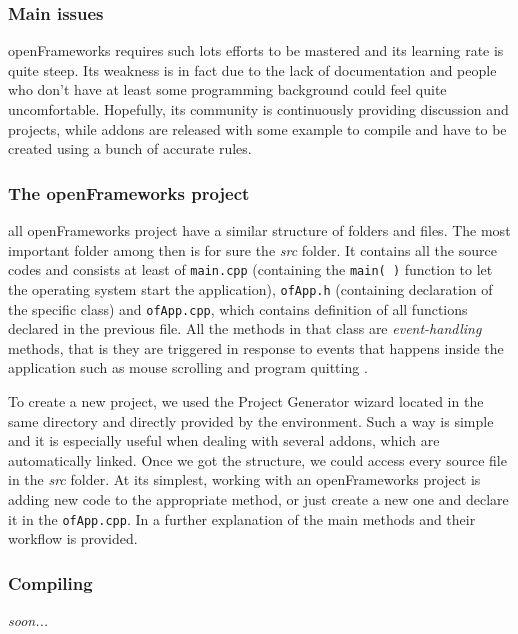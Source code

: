 \documentclass[journal]{IEEEtran}
\begin{document}
\subsubsection{Main issues}
openFrameworks requires such lots efforts to be mastered and its learning rate is quite steep. Its weakness is in fact due to the lack of documentation and people who don't have at least some programming background could feel quite uncomfortable. Hopefully, its community is continuously providing discussion and projects, while addons are released with some example to compile and have to be created using a bunch of accurate rules.

\subsubsection{The openFrameworks project}
all openFrameworks project have a similar structure of folders and files. The most important folder among then is for sure the \emph{src} folder. It contains all the source codes and consists at least of \texttt{main.cpp} (containing the \texttt{main( )} function to let the operating system start the application), \texttt{ofApp.h} (containing declaration of the specific class) and \texttt{ofApp.cpp}, which contains definition of all functions declared in the previous file. All the methods in that class are \emph{event-handling} methods, that is they are triggered in response to events that happens inside the application such as mouse scrolling and program quitting \note{}. 

To create a new project, we used the Project Generator wizard located in the same directory and directly provided by the environment. Such a way is simple and it is especially useful when dealing with several addons, which are automatically linked. Once we got the structure, we could access every source file in the \emph{src} folder. At its simplest, working with an openFrameworks project is adding new code to the appropriate method, or just create a new one and declare it in the \texttt{ofApp.cpp}. In \cite{} a further explanation of the main methods and their workflow is provided.

\subsubsection{Compiling}
\textit{soon...}

 
\end{document}
